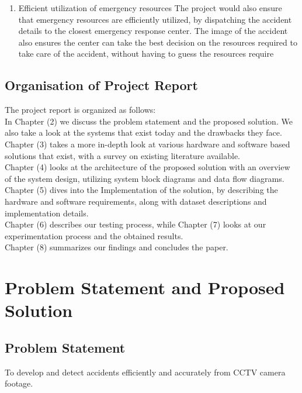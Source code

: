 \documentclass[ 12pt,a4paper,twocolumn,fleqn]{article}
\begin{document}
\begin{adjustwidth}{3.5em}{0pt}
\begin{enumerate}
\item {Efficient utilization of emergency resources
The project would also ensure that emergency resources are efficiently utilized, by dispatching the accident details to the closest emergency response center. The image of the accident also ensures the center can take the best decision on the resources required to take care of the accident, without having to guess the resources require}
\end{enumerate}

\newpage
  \pagestyle{fancy}
  
\subsection{Organisation of Project Report}

The project report is organized as follows:\\
In Chapter (2) we discuss the problem statement and the proposed solution. We also take a look at the systems that exist today and the drawbacks they face. \\
Chapter (3) takes a more in-depth look at various hardware and software based solutions that exist, with a survey on existing literature available. \\ Chapter (4) looks at the architecture of the proposed solution with an overview of the system design, utilizing system block diagrams and data flow diagrams. \\
Chapter (5) dives into the Implementation of the solution, by describing the hardware and software requirements, along with dataset descriptions and implementation details. \\
Chapter (6) describes our testing process, while Chapter (7) looks at our experimentation process and the obtained results. \\
Chapter (8) summarizes our findings and concludes the paper. 


\newpage
  \pagestyle{fancy}
\section{Problem Statement and Proposed Solution}
\subsection{Problem Statement}

To develop and detect accidents efficiently and accurately from CCTV camera footage.



\end{adjustwidth}
\end{document}

